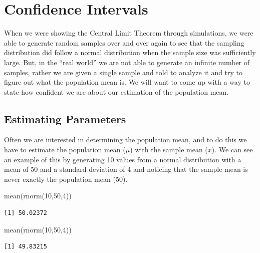 \documentclass[
  letterpaper,
  DIV=11,
  numbers=noendperiod]{scrreprt}
\newenvironment{Shaded}{\begin{snugshade}}{\end{snugshade}}
\newcommand{\DecValTok}[1]{\textcolor[rgb]{0.68,0.00,0.00}{#1}}
\newcommand{\FunctionTok}[1]{\textcolor[rgb]{0.28,0.35,0.67}{#1}}
\newcommand{\NormalTok}[1]{\textcolor[rgb]{0.00,0.23,0.31}{#1}}
\begin{document}

\chapter{Confidence Intervals}\label{confidence-intervals}

When we were showing the Central Limit Theorem through simulations, we
were able to generate random samples over and over again to see that the
sampling distribution did follow a normal distribution when the sample
size was sufficiently large. But, in the ``real world'' we are not able
to generate an infinite number of samples, rather we are given a single
sample and told to analyze it and try to figure out what the population
mean is. We will want to come up with a way to state how confident we
are about our estimation of the population mean.

\section{Estimating Parameters}\label{estimating-parameters}

Often we are interested in determining the population mean, and to do
this we have to estimate the population mean (\(\mu\)) with the sample
mean (\(\overline{x}\)). We can see an example of this by generating 10
values from a normal distribution with a mean of 50 and a standard
deviation of 4 and noticing that the sample mean is never exactly the
population mean (50).

\begin{Shaded}
\begin{Highlighting}[]
\FunctionTok{mean}\NormalTok{(}\FunctionTok{rnorm}\NormalTok{(}\DecValTok{10}\NormalTok{,}\DecValTok{50}\NormalTok{,}\DecValTok{4}\NormalTok{))}
\end{Highlighting}
\end{Shaded}

\begin{verbatim}
[1] 50.02372
\end{verbatim}

\begin{Shaded}
\begin{Highlighting}[]
\FunctionTok{mean}\NormalTok{(}\FunctionTok{rnorm}\NormalTok{(}\DecValTok{10}\NormalTok{,}\DecValTok{50}\NormalTok{,}\DecValTok{4}\NormalTok{))}
\end{Highlighting}
\end{Shaded}

\begin{verbatim}
[1] 49.83215
\end{verbatim}
\end{document}
